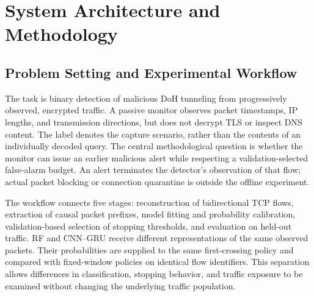 \documentclass[conference]{IEEEtran}
\begin{document}
\section{System Architecture and Methodology}
\label{sec:methodology}


\subsection{Problem Setting and Experimental Workflow}
The task is binary detection of malicious DoH tunneling from progressively observed, encrypted traffic. A passive monitor observes packet timestamps, IP lengths, and transmission directions, but does not decrypt TLS or inspect DNS content. The label denotes the capture scenario, rather than the contents of an individually decoded query. The central methodological question is whether the monitor can issue an earlier malicious alert while respecting a validation-selected false-alarm budget. An alert terminates the detector's observation of that flow; actual packet blocking or connection quarantine is outside the offline experiment.

The workflow connects five stages: reconstruction of bidirectional TCP flows, extraction of causal packet prefixes, model fitting and probability calibration, validation-based selection of stopping thresholds, and evaluation on held-out traffic. RF and CNN--GRU receive different representations of the same observed packets. Their probabilities are supplied to the same first-crossing policy and compared with fixed-window policies on identical flow identifiers. This separation allows differences in classification, stopping behavior, and traffic exposure to be examined without changing the underlying traffic population.
\end{document}
